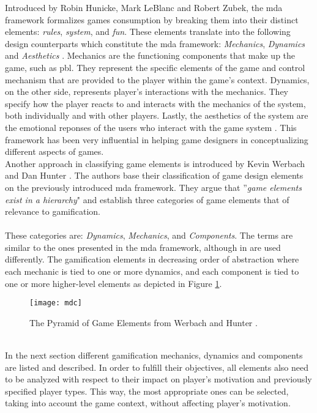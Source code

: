 Introduced by Robin Hunicke, Mark LeBlanc and Robert Zubek, the \acrshort{mda} framework formalizes games consumption by breaking them into their distinct elements: \textit{rules}, \textit{system}, and \textit{fun}. These elements translate into the following design counterparts which constitute the \acrshort{mda} framework: \textit{Mechanics}, \textit{Dynamics} and \textit{Aesthetics} \cite{hunicke2004mda}. Mechanics are the functioning components that make up the game, such as \acrshort{pbl}. They represent the specific elements of the game and control mechanism that are provided to the player within the game's context. Dynamics, on the other side, represents player's interactions with the mechanics. They specify how the player reacts to and interacts with the mechanics of the system, both individually and with other players. Lastly, the aesthetics of the system are the emotional reponses of the users who interact with the game system \cite{zichermann2011gamification}. This framework has been very influential in helping game designers in conceptualizing different aspects of games.\\ Another approach in classifying game elements is introduced by Kevin Werbach and Dan Hunter \cite{werbach2012win}. The authors base their classification of game design elements on the previously introduced \acrshort{mda} framework. They argue that ''\textit{game elements exist in a hierarchy}" and establish three categories of game elements that of relevance to gamification. \\\\These categories are: \textit{Dynamics}, \textit{Mechanics}, and \textit{Components}. The terms are similar to the ones presented in the \acrshort{mda} framework, although in \cite{werbach2012win} are used differently. The gamification elements in decreasing order of abstraction where each mechanic is tied to one or more dynamics, and each component is tied to one or more higher-level elements as depicted in Figure \ref{fig:mdc}.
\begin{figure}[h]
    \centering
    \texttt{[image: mdc]}
    \caption{The Pyramid of Game Elements from Werbach and Hunter \cite{werbach2012win}.}
    \label{fig:mdc}
\end{figure}\\
In the next section different gamification mechanics, dynamics and components are listed and described. In order to fulfill their objectives, all elements also need to be analyzed with respect to their impact on player's motivation and previously specified player types. This way, the most appropriate ones can be selected, taking into account the game context, without affecting player's motivation.
